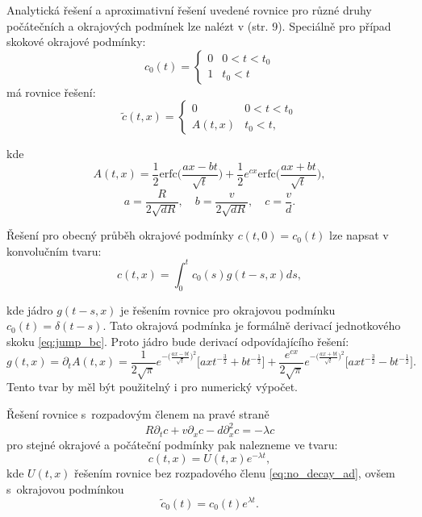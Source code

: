 \documentclass{article}
\def\prtl{\partial}
\begin{document}
Analytická řešení a aproximativní řešení uvedené rovnice pro různé druhy počátečních
a okrajových podmínek lze nalézt v \cite{Genuchten1982} (str. 9). 
Speciálně pro případ skokové okrajové podmínky:
\begin{equation}
    \label{eq:jump_bc}
    c_0(t) = \left\{\begin{array}{ll}
         0 & 0 < t < t_0 \\
         1   & t_0 < t
    \end{array}\right. 
\end{equation}
má rovnice řešení:
\begin{equation}
    \label{eq:jump_sol}
    \tilde c(t, x) = 
    \left\{\begin{array}{ll}
         0                     & 0 < t < t_0 \\
         A(t,x)   & t_0 < t,
    \end{array}\right. 
\end{equation}

kde
\[
    A(t,x) = \frac12 \mathrm{erfc}\Big(\frac{ax-bt}{\sqrt t}\Big)
    + \frac12 e^{cx}\mathrm{erfc}\Big(\frac{ax+bt}{\sqrt t}\Big),
\]
\[
    a = \frac{R}{2\sqrt{dR}},\quad 
    b=\frac{v}{2\sqrt{dR}},\quad 
    c=\frac{v}{d}.
\]

Řešení pro obecný průběh okrajové podmínky $c(t,0) = c_0(t)$ lze napsat v konvolučním tvaru:
\[
    c(t,x) = \int_0^t c_0(s) g(t - s, x) ds,
\]

kde jádro $g(t - s, x)$ je řešením rovnice pro okrajovou podmínku $c_0(t) = \delta(t - s)$. 
Tato okrajová podmínka je formálně derivací jednotkového skoku \eqref{eq:jump_bc}. 
Proto jádro bude derivací odpovídajícího řešení:
\[
    g(t, x) = \prtl_t A(t, x) = 
    \frac{1}{2\sqrt{\pi}} 
    e^{-\big( \frac{ax-bt}{\sqrt{t}}\big)^2}
    \Big[ ax t^{-\frac32} + b t^{-\frac12}\Big]
    + \frac{e^{cx}}{2\sqrt{\pi}}  
    e^{-\big( \frac{ax+bt}{\sqrt{t}}\big)^2}
    \Big[ ax t^{-\frac32} - b t^{-\frac12}\Big].
\]
Tento tvar by měl být použitelný i pro numerický výpočet.


Řešení rovnice s~rozpadovým členem na pravé straně
\[
 R\prtl_t c + v \prtl_x c - d \prtl^2_x c = - \lambda c
\]
pro stejné okrajové a počáteční podmínky pak nalezneme ve tvaru:
\[
    c(t,x) = U(t,x) e^{-\lambda t},
\]
kde $U(t,x)$ řešením rovnice bez rozpadového členu \eqref{eq:no_decay_ad}, ovšem s~okrajovou podmínkou
\[
    \tilde{c}_0(t) = c_0(t) e^{\lambda t}.
\]


\end{document}
